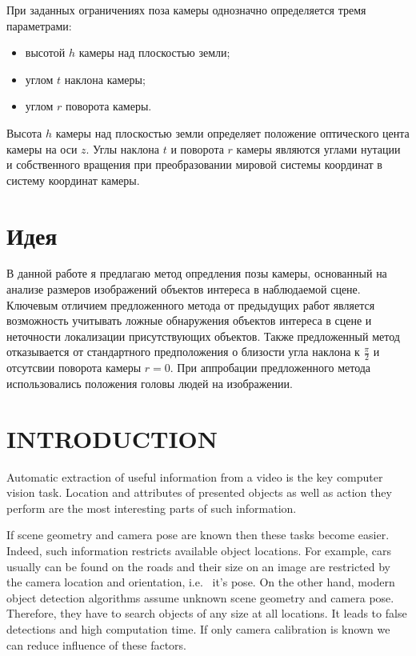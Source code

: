 При заданных ограничениях поза камеры однозначно определяется тремя параметрами:
\begin{itemize}
	\item высотой $h$ камеры над плоскостью земли;
	\item углом $t$ наклона камеры;
	\item углом $r$ поворота камеры.
\end{itemize}

Высота $h$ камеры над плоскостью земли определяет положение оптического цента камеры на оси $z$. Углы наклона $t$ и поворота $r$ камеры являются углами нутации и собственного вращения при преобразовании мировой системы координат в систему координат камеры.

\section{Идея}

В данной работе я предлагаю метод опредления позы камеры, основанный на анализе размеров изображений объектов интереса в наблюдаемой сцене. Ключевым отличием предложенного метода от предыдущих работ является возможность учитывать ложные обнаружения объектов интереса в сцене и неточности локализации присутствующих объектов. Также предложенный метод отказывается от стандартного предположения о близости угла наклона к 
$\frac{\pi}{2}$
и отсутсвии поворота камеры $r=0$. 
При аппробации предложенного метода использовались положения головы людей на изображении.

\section{\uppercase{Introduction}}
\label{sec:introduction}

\noindent Automatic extraction of useful information from a video is the key computer vision task. Location and attributes of presented objects as well as action they perform are the most interesting parts of such information.

If scene geometry and camera pose are known then these tasks become easier. Indeed, such information restricts available object locations. For example, cars usually can be found on the roads and their size on an image are restricted by the camera location and orientation, i.e.~ it's pose. On the other hand, modern object detection algorithms assume unknown scene geometry and camera pose. Therefore, they have to search objects of any size at all locations. It leads to false detections and high computation time. If only camera calibration is known we can reduce influence of these factors.

